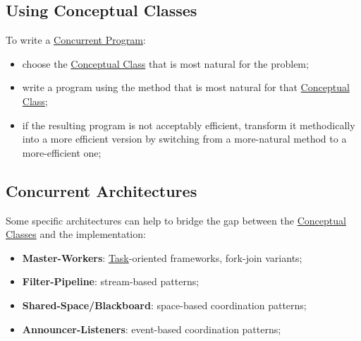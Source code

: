 \subsection{Using Conceptual Classes}\label{sub:ed_using_conceptual_classes} %
To write a \hyperref[def:conc-program]{Concurrent Program}:
\begin{itemize}
    \item choose the \hyperref[sub:ed_conceptual_classes]{Conceptual Class} that is most natural for the problem;
    \item write a program using the method that is most natural for that \hyperref[sub:ed_conceptual_classes]{Conceptual Class};
    \item if the resulting program is not acceptably efficient, transform it methodically into a more efficient version by switching from a more-natural method to a more-efficient one;
\end{itemize}
%
\subsection{Concurrent Architectures}\label{sub:ed_concurrent_architectures} %
Some specific architectures can help to bridge the gap between the \hyperref[sub:ed_conceptual_classes]{Conceptual Classes} and the implementation:
\begin{itemize}
    \item \textbf{Master-Workers}: \hyperref[def:task]{Task}-oriented frameworks, fork-join variants;
    \item \textbf{Filter-Pipeline}: stream-based patterns;
    \item \textbf{Shared-Space/Blackboard}: space-based coordination patterns;
    \item \textbf{Announcer-Listeners}: event-based coordination patterns;
\end{itemize}
%
